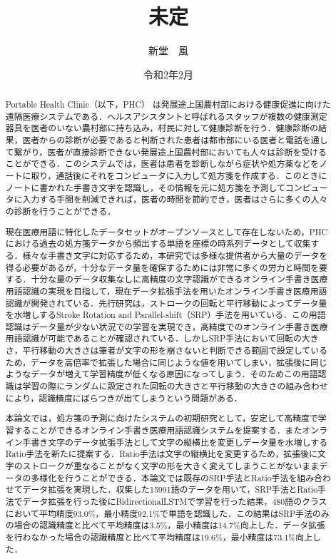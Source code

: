 \documentclass[a4paper,12pt]{jreport}
\title{未定}
\author{新堂　風}
\date{令和2年2月}
\begin{document}
\maketitle
\thispagestyle{empty}

\begin{abstract}
 Portable Health Clinic（以下，PHC） は発展途上国農村部における健康促進に向けた遠隔医療システムである．ヘルスアシスタントと呼ばれるスタッフが複数の健康測定器具を医者のいない農村部に持ち込み，村民に対して健康診断を行う．健康診断の結果，医者からの診断が必要であると判断された患者は都市部にいる医者と電話を通して繋がり，医者が直接診断できない発展途上国農村部においても人々は診断を受けることができる．このシステムでは，医者は患者を診断しながら症状や処方薬などをノートに取り，通話後にそれをコンピュータに入力して処方箋を作成する．このときにノートに書かれた手書き文字を認識し，その情報を元に処方箋を予測してコンピュータに入力する手間を削減できれば，医者の時間を節約でき，医者はさらに多くの人々の診断を行うことができる．

現在医療用語に特化したデータセットがオープンソースとして存在しないため，PHCにおける過去の処方箋データから頻出する単語を座標の時系列データとして収集する．様々な手書き文字に対応するため，本研究では多様な提供者から大量のデータを得る必要があるが，十分なデータ量を確保するためには非常に多くの労力と時間を要する．十分な量のデータ収集なしに高精度の文字認識ができるオンライン手書き医療用語認識の実現を目指して，現在データ拡張手法を用いたオンライン手書き医療用語認識\cite{takahashi}が開発されている．先行研究\cite{takahashi}は，ストロークの回転と平行移動によってデータ量を水増しするStroke Rotation and Parallel-shift（SRP）手法を用いている．この用語認識はデータ量が少ない状況での学習を実現でき，高精度でのオンライン手書き医療用語認識が可能であることが確認されている．しかしSRP手法において回転の大きさ，平行移動の大きさは筆者が文字の形を崩さないと判断できる範囲で設定しているため，データを高倍率で拡張した場合に同じような値を用いてしまい，拡張後に同じようなデータが増えて学習精度が低くなる原因になってしまう．そのためこの用語認識は学習の際にランダムに設定された回転の大きさと平行移動の大きさの組み合わせにより，認識精度にばらつきが出てしまうという問題がある．

本論文では，処方箋の予測に向けたシステムの初期研究として，安定して高精度で学習することができるオンライン手書き医療用語認識システムを提案する．またオンライン手書き文字のデータ拡張手法として文字の縦横比を変更しデータ量を水増しするRatio手法を新たに提案する．Ratio手法は文字の縦横比を変更するため，拡張後に文字のストロークが重なることがなく文字の形を大きく変えてしまうことがないままデータの多様化を行うことができる．本論文では既存のSRP手法とRatio手法を組み合わせてデータ拡張を実現した．収集した15991語のデータを用いて，SRP手法とRatio手法でデータ拡張を行った後にBidirectionalLSTMで学習を行った結果，480語のクラスにおいて平均精度93.0\%，最小精度92.1\%で単語を認識した．この結果はSRP手法のみの場合の認識精度と比べて平均精度は3.5\%，最小精度は14.7\%向上した．データ拡張を行わなかった場合の認識精度と比べて平均精度は19.6\%，最小精度は73.1\%向上した．
\end{abstract}
\end{document}
